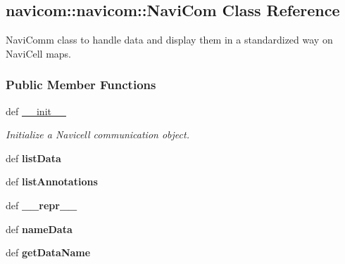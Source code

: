 \hypertarget{classnavicom_1_1navicom_1_1NaviCom}{
\subsection{navicom::navicom::NaviCom Class Reference}
\label{classnavicom_1_1navicom_1_1NaviCom}
}


NaviComm class to handle data and display them in a standardized way on NaviCell maps.  


\subsubsection*{Public Member Functions}
\begin{DoxyCompactItemize}
\item 
def \hyperlink{classnavicom_1_1navicom_1_1NaviCom_ae6133fe7ec63cf5643c1794f4f8e2349}{\_\-\_\-init\_\-\_\-}
\begin{DoxyCompactList}\small\item\em Initialize a Navicell communication object. \item\end{DoxyCompactList}\item 
\hypertarget{classnavicom_1_1navicom_1_1NaviCom_a6eadb16a25ab948c152661c740175383}{
def {\bfseries listData}}
\label{classnavicom_1_1navicom_1_1NaviCom_a6eadb16a25ab948c152661c740175383}

\item 
\hypertarget{classnavicom_1_1navicom_1_1NaviCom_aaf13b634968129b3216c5cb54b70c2ad}{
def {\bfseries listAnnotations}}
\label{classnavicom_1_1navicom_1_1NaviCom_aaf13b634968129b3216c5cb54b70c2ad}

\item 
\hypertarget{classnavicom_1_1navicom_1_1NaviCom_a29ada4f47f518f16ecd59dc569840078}{
def {\bfseries \_\-\_\-repr\_\-\_\-}}
\label{classnavicom_1_1navicom_1_1NaviCom_a29ada4f47f518f16ecd59dc569840078}

\item 
\hypertarget{classnavicom_1_1navicom_1_1NaviCom_a8e735eed992a5cf92616113d47eea6ee}{
def {\bfseries nameData}}
\label{classnavicom_1_1navicom_1_1NaviCom_a8e735eed992a5cf92616113d47eea6ee}

\item 
\hypertarget{classnavicom_1_1navicom_1_1NaviCom_a51ecb41beebc7636bde73be2e1ffc407}{
def {\bfseries getDataName}}
\label{classnavicom_1_1navicom_1_1NaviCom_a51ecb41beebc7636bde73be2e1ffc407}


\end{DoxyCompactItemize}
